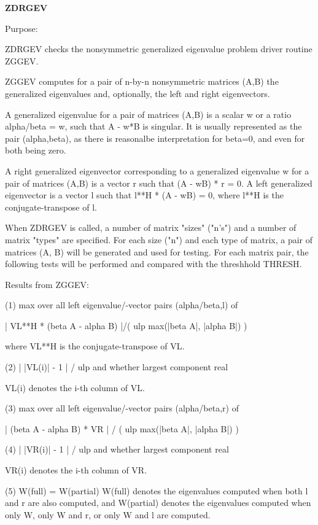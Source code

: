 {\bfseries Z\+D\+R\+G\+E\+V} 

\begin{DoxyParagraph}{Purpose\+: }
\begin{DoxyVerb} ZDRGEV checks the nonsymmetric generalized eigenvalue problem driver
 routine ZGGEV.

 ZGGEV computes for a pair of n-by-n nonsymmetric matrices (A,B) the
 generalized eigenvalues and, optionally, the left and right
 eigenvectors.

 A generalized eigenvalue for a pair of matrices (A,B) is a scalar w
 or a ratio  alpha/beta = w, such that A - w*B is singular.  It is
 usually represented as the pair (alpha,beta), as there is reasonalbe
 interpretation for beta=0, and even for both being zero.

 A right generalized eigenvector corresponding to a generalized
 eigenvalue  w  for a pair of matrices (A,B) is a vector r  such that
 (A - wB) * r = 0.  A left generalized eigenvector is a vector l such
 that l**H * (A - wB) = 0, where l**H is the conjugate-transpose of l.

 When ZDRGEV is called, a number of matrix "sizes" ("n's") and a
 number of matrix "types" are specified.  For each size ("n")
 and each type of matrix, a pair of matrices (A, B) will be generated
 and used for testing.  For each matrix pair, the following tests
 will be performed and compared with the threshhold THRESH.

 Results from ZGGEV:

 (1)  max over all left eigenvalue/-vector pairs (alpha/beta,l) of

      | VL**H * (beta A - alpha B) |/( ulp max(|beta A|, |alpha B|) )

      where VL**H is the conjugate-transpose of VL.

 (2)  | |VL(i)| - 1 | / ulp and whether largest component real

      VL(i) denotes the i-th column of VL.

 (3)  max over all left eigenvalue/-vector pairs (alpha/beta,r) of

      | (beta A - alpha B) * VR | / ( ulp max(|beta A|, |alpha B|) )

 (4)  | |VR(i)| - 1 | / ulp and whether largest component real

      VR(i) denotes the i-th column of VR.

 (5)  W(full) = W(partial)
      W(full) denotes the eigenvalues computed when both l and r
      are also computed, and W(partial) denotes the eigenvalues
      computed when only W, only W and r, or only W and l are
      computed.


\end{DoxyVerb}
\end{DoxyParagraph}
